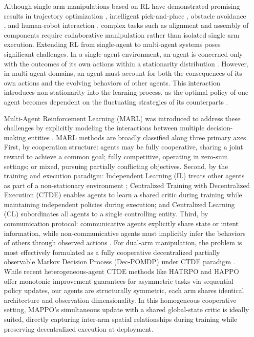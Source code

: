 \documentclass[lettersize,journal]{IEEEtran}
\begin{document}
Although single arm manipulations based on RL have demonstrated promising results in trajectory optimization \cite{intro-12, intro-13}, intelligent pick-and-place \cite{intro-14, intro-15}, obstacle avoidance \cite{intro-16, intro-17}, and human-robot interaction \cite{intro-18, intro-19}, complex tasks such as alignment and assembly of components require collaborative manipulation rather than isolated single arm execution. Extending RL from single-agent to multi-agent systems poses significant challenges. In a single-agent environment, an agent is concerned only with the outcomes of its own actions within a stationarity distribution \cite{intro-21}. However, in multi-agent domains, an agent must account for both the consequences of its own actions and the evolving behaviors of other agents. This interaction introduces non-stationarity into the learning process, as the optimal policy of one agent becomes dependent on the fluctuating strategies of its counterparts \cite{intro-20}.

Multi-Agent Reinforcement Learning (MARL) was introduced to address these challenges by explicitly modeling the interactions between multiple decision-making entities \cite{intro-22}. MARL methods are broadly classified along three primary axes. First, by cooperation structure: agents may be fully cooperative, sharing a joint reward to achieve a common goal; fully competitive, operating in zero-sum settings; or mixed, pursuing partially conflicting objectives. Second, by the training and execution paradigm: Independent Learning (IL) treats other agents as part of a non-stationary environment \cite{IPPO}; Centralized Training with Decentralized Execution (CTDE) enables agents to learn a shared critic during training while maintaining independent policies during execution; and Centralized Learning (CL) subordinates all agents to a single controlling entity. Third, by communication protocol: communicative agents explicitly share state or intent information, while non-communicative agents must implicitly infer the behaviors of others through observed actions \cite{intro-23, intro-25}. For dual-arm manipulation, the problem is most effectively formulated as a fully cooperative decentralized partially observable Markov Decision Process (Dec-POMDP) under CTDE paradigm \cite{MAPPO}. While recent heterogeneous-agent CTDE methods like HATRPO and HAPPO \cite{happo/htrpo} offer monotonic improvement guarantees for asymmetric tasks via sequential policy updates, our agents are structurally symmetric, each arm shares identical architecture and observation dimensionality. In this homogeneous cooperative setting, MAPPO's simultaneous update with a shared global-state critic is ideally suited, directly capturing inter-arm spatial relationships during training while preserving decentralized execution at deployment.
\end{document}
